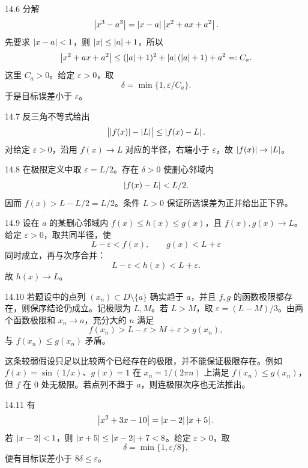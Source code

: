 \begin{solution}{14.6}
分解
\[
 \left|x^3-a^3\right|=\left|x-a\right|\left|x^2+ax+a^2\right|.
\]
先要求 \(\left|x-a\right|<1\)，则 \(\left|x\right|\le\left|a\right|+1\)，所以
\[
 \left|x^2+ax+a^2\right|
 \le(\left|a\right|+1)^2+\left|a\right|(\left|a\right|+1)+a^2=:C_a.
\]
这里 \(C_a>0\)。给定 \(\varepsilon>0\)，取
\[
 \delta=\min\{1,\varepsilon/C_a\}.
\]
于是目标误差小于 \(\varepsilon\)。
\end{solution}

\begin{solution}{14.7}
反三角不等式给出
\[
 \bigl|\left|f(x)\right|-\left|L\right|\bigr|\le\left|f(x)-L\right|.
\]
对给定 \(\varepsilon>0\)，沿用 \(f(x)\to L\) 对应的半径，右端小于 \(\varepsilon\)，故 \(\left|f(x)\right|\to\left|L\right|\)。
\end{solution}

\begin{solution}{14.8}
在极限定义中取 \(\varepsilon=L/2\)。存在 \(\delta>0\) 使删心邻域内
\[
 \left|f(x)-L\right|<L/2.
\]
因而 \(f(x)>L-L/2=L/2\)。条件 \(L>0\) 保证所选误差为正并给出正下界。
\end{solution}

\begin{solution}{14.9}
设在 \(a\) 的某删心邻域内 \(f(x)\le h(x)\le g(x)\)，且 \(f(x),g(x)\to L\)。给定 \(\varepsilon>0\)，取共同半径，使
\[
 L-\varepsilon<f(x),\qquad g(x)<L+\varepsilon
\]
同时成立，再与次序合并：
\[
 L-\varepsilon<h(x)<L+\varepsilon.
\]
故 \(h(x)\to L\)。
\end{solution}

\begin{solution}{14.10}
若题设中的点列 \((x_n)\subset D\setminus\{a\}\) 确实趋于 \(a\)，并且 \(f,g\) 的函数极限都存在，则保序结论仍成立。记极限为 \(L,M\)。若 \(L>M\)，取 \(\varepsilon=(L-M)/3\)。由两个函数极限和 \(x_n\to a\)，充分大的 \(n\) 满足
\[
 f(x_n)>L-\varepsilon>M+\varepsilon>g(x_n),
\]
与 \(f(x_n)\le g(x_n)\) 矛盾。

这条较弱假设只足以比较两个已经存在的极限，并不能保证极限存在。例如 \(f(x)=\sin(1/x)\)、\(g(x)=1\) 在 \(x_n=1/(2\pi n)\) 上满足 \(f(x_n)\le g(x_n)\)，但 \(f\) 在 \(0\) 处无极限。若点列不趋于 \(a\)，则连极限次序也无法推出。
\end{solution}

\begin{solution}{14.11}
有
\[
 \left|x^2+3x-10\right|
 =\left|x-2\right|\left|x+5\right|.
\]
若 \(\left|x-2\right|<1\)，则 \(\left|x+5\right|\le\left|x-2\right|+7<8\)。给定 \(\varepsilon>0\)，取
\[
 \delta=\min\{1,\varepsilon/8\},
\]
便有目标误差小于 \(8\delta\le\varepsilon\)。
\end{solution}

